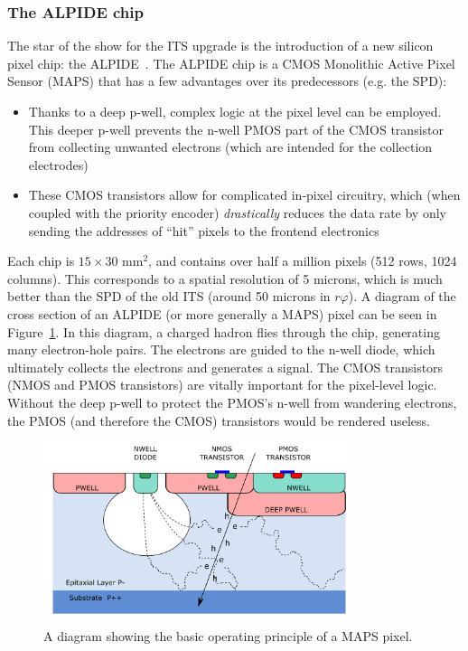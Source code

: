 \subsubsection{The ALPIDE chip}
The star of the show for the ITS upgrade is the introduction of a new silicon pixel chip: the ALPIDE~\cite{ALPIDE}. The ALPIDE chip is a CMOS Monolithic Active Pixel Sensor (MAPS) that has a few advantages over its predecessors (e.g. the SPD):
\begin{itemize}
    \item Thanks to a deep p-well, complex logic at the pixel level can be employed. This deeper p-well prevents the n-well PMOS part of the CMOS transistor from collecting unwanted electrons (which are intended for the collection electrodes)
    \item These CMOS transistors allow for complicated in-pixel circuitry, which (when coupled with the priority encoder) \textit{drastically} reduces the data rate by only sending the addresses of ``hit'' pixels to the frontend electronics
\end{itemize}
Each chip is $15\times30$ mm$^2$, and contains over half a million pixels (512 rows, 1024 columns). This corresponds to a spatial resolution of 5 microns, which is much better than the SPD of the old ITS (around 50 microns in $r\varphi$). A diagram of the cross section of an ALPIDE (or more generally a MAPS) pixel can be seen in Figure~\ref{fig:alpide_diagram}. In this diagram, a charged hadron flies through the chip, generating many electron-hole pairs. The electrons are guided to the n-well diode, which ultimately collects the electrons and generates a signal. The CMOS transistors (NMOS and PMOS transistors) are vitally important for the pixel-level logic. Without the deep p-well to protect the PMOS's n-well from wandering electrons, the PMOS (and therefore the CMOS) transistors would be rendered useless.

\begin{figure}
    \centering
    \includegraphics[width=0.8\textwidth]{figures/experiment/alpide_cross.png}
    \caption{A diagram showing the basic operating principle of a MAPS pixel.}
    \label{fig:alpide_diagram}
\end{figure}

